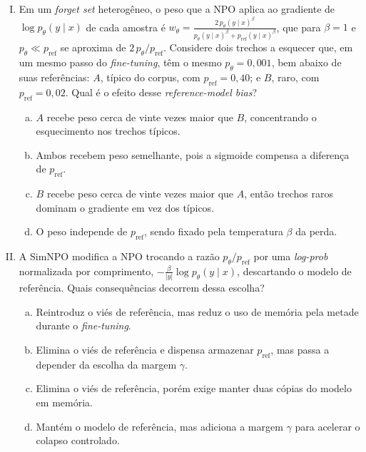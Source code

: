 \documentclass{dlproblemset}
\begin{document}
\begin{enumerate}[I)]
    \item Em um \textit{forget set} heterogêneo, o peso que a NPO aplica ao gradiente de $\log p_\theta(y\mid x)$ de cada amostra é $w_\theta = \frac{2\,p_\theta(y\mid x)^\beta}{p_\theta(y\mid x)^\beta + p_{\text{ref}}(y\mid x)^\beta}$, que para $\beta = 1$ e $p_\theta \ll p_{\text{ref}}$ se aproxima de $2\,p_\theta/p_{\text{ref}}$. Considere dois trechos a esquecer que, em um mesmo passo do \textit{fine-tuning}, têm o mesmo $p_\theta = 0{,}001$, bem abaixo de suas referências: $A$, típico do corpus, com $p_{\text{ref}} = 0{,}40$; e $B$, raro, com $p_{\text{ref}} = 0{,}02$. Qual é o efeito desse \textit{reference-model bias}?
    \begin{enumerate}[(a)]
        \item $A$ recebe peso cerca de vinte vezes maior que $B$, concentrando o esquecimento nos trechos típicos.
        \item Ambos recebem peso semelhante, pois a sigmoide compensa a diferença de $p_{\text{ref}}$.
        \item $B$ recebe peso cerca de vinte vezes maior que $A$, então trechos raros dominam o gradiente em vez dos típicos.
        \item O peso independe de $p_{\text{ref}}$, sendo fixado pela temperatura $\beta$ da perda.
    \end{enumerate}

    \item A SimNPO modifica a NPO trocando a razão $p_\theta/p_{\text{ref}}$ por uma \textit{log-prob} normalizada por comprimento, $-\frac{\beta}{|y|}\log p_\theta(y\mid x)$, descartando o modelo de referência. Quais consequências decorrem dessa escolha?
    \begin{enumerate}[(a)]
        \item Reintroduz o viés de referência, mas reduz o uso de memória pela metade durante o \textit{fine-tuning}.
        \item Elimina o viés de referência e dispensa armazenar $p_{\text{ref}}$, mas passa a depender da escolha da margem $\gamma$.
        \item Elimina o viés de referência, porém exige manter duas cópias do modelo em memória.
        \item Mantém o modelo de referência, mas adiciona a margem $\gamma$ para acelerar o colapso controlado.
    \end{enumerate}


\end{enumerate}
\end{document}
